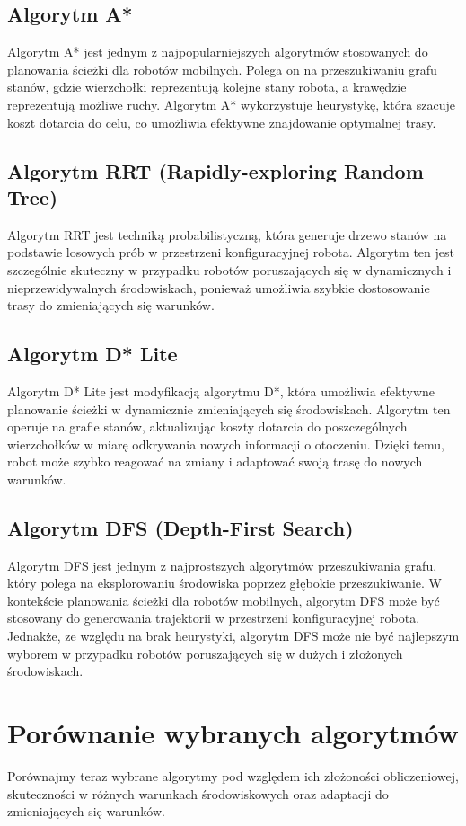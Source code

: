 \documentclass[10pt,a4paper]{article}
\begin{document}
\subsection{Algorytm A*}
Algorytm A* jest jednym z najpopularniejszych algorytmów stosowanych do planowania ścieżki dla robotów mobilnych. Polega on na przeszukiwaniu grafu stanów, gdzie wierzchołki reprezentują kolejne stany robota, a krawędzie reprezentują możliwe ruchy. Algorytm A* wykorzystuje heurystykę, która szacuje koszt dotarcia do celu, co umożliwia efektywne znajdowanie optymalnej trasy.

\subsection{Algorytm RRT (Rapidly-exploring Random Tree)}
Algorytm RRT jest techniką probabilistyczną, która generuje drzewo stanów na podstawie losowych prób w przestrzeni konfiguracyjnej robota. Algorytm ten jest szczególnie skuteczny w przypadku robotów poruszających się w dynamicznych i nieprzewidywalnych środowiskach, ponieważ umożliwia szybkie dostosowanie trasy do zmieniających się warunków.

\subsection{Algorytm D* Lite}
Algorytm D* Lite jest modyfikacją algorytmu D*, która umożliwia efektywne planowanie ścieżki w dynamicznie zmieniających się środowiskach. Algorytm ten operuje na grafie stanów, aktualizując koszty dotarcia do poszczególnych wierzchołków w miarę odkrywania nowych informacji o otoczeniu. Dzięki temu, robot może szybko reagować na zmiany i adaptować swoją trasę do nowych warunków.

\subsection{Algorytm DFS (Depth-First Search)}
Algorytm DFS jest jednym z najprostszych algorytmów przeszukiwania grafu, który polega na eksplorowaniu środowiska poprzez głębokie przeszukiwanie. W kontekście planowania ścieżki dla robotów mobilnych, algorytm DFS może być stosowany do generowania trajektorii w przestrzeni konfiguracyjnej robota. Jednakże, ze względu na brak heurystyki, algorytm DFS może nie być najlepszym wyborem w przypadku robotów poruszających się w dużych i złożonych środowiskach.

\section{Porównanie wybranych algorytmów}
Porównajmy teraz wybrane algorytmy pod względem ich złożoności obliczeniowej, skuteczności w różnych warunkach środowiskowych oraz adaptacji do zmieniających się warunków.
\end{document}
